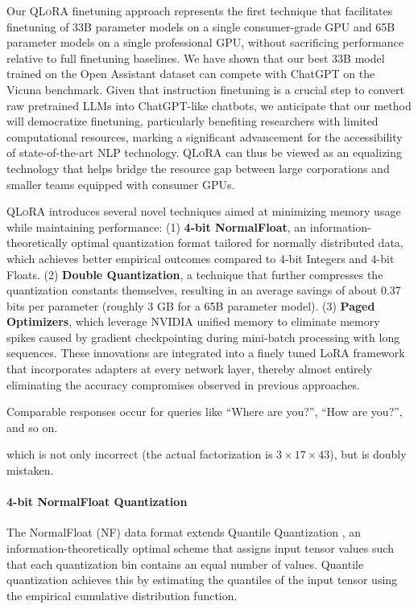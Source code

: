 Our \textsc{QLoRA} finetuning approach represents the first technique that facilitates finetuning of 33B parameter models on a single consumer-grade GPU and 65B parameter models on a single professional GPU, without sacrificing performance relative to full finetuning baselines. We have shown that our best 33B model trained on the Open Assistant dataset can compete with ChatGPT on the Vicuna benchmark. Given that instruction finetuning is a crucial step to convert raw pretrained LLMs into ChatGPT-like chatbots, we anticipate that our method will democratize finetuning, particularly benefiting researchers with limited computational resources, marking a significant advancement for the accessibility of state-of-the-art NLP technology. \textsc{QLoRA} can thus be viewed as an equalizing technology that helps bridge the resource gap between large corporations and smaller teams equipped with consumer GPUs.

\textsc{QLoRA} introduces several novel techniques aimed at minimizing memory usage while maintaining performance: (1) \textbf{4-bit NormalFloat}, an information-theoretically optimal quantization format tailored for normally distributed data, which achieves better empirical outcomes compared to 4-bit Integers and 4-bit Floats. (2) \textbf{Double Quantization}, a technique that further compresses the quantization constants themselves, resulting in an average savings of about 0.37 bits per parameter (roughly 3 GB for a 65B parameter model). (3) \textbf{Paged Optimizers}, which leverage NVIDIA unified memory to eliminate memory spikes caused by gradient checkpointing during mini-batch processing with long sequences. These innovations are integrated into a finely tuned LoRA framework that incorporates adapters at every network layer, thereby almost entirely eliminating the accuracy compromises observed in previous approaches.

Comparable responses occur for queries like ``Where are you?'', ``How are you?'', and so on.

which is not only incorrect (the actual factorization is $3 \times 17 \times 43$), but is doubly mistaken.

\paragraph{4-bit NormalFloat Quantization} The NormalFloat (NF) data format extends Quantile Quantization \citep{dettmers2022optimizers}, an information-theoretically optimal scheme that assigns input tensor values such that each quantization bin contains an equal number of values. Quantile quantization achieves this by estimating the quantiles of the input tensor using the empirical cumulative distribution function.

